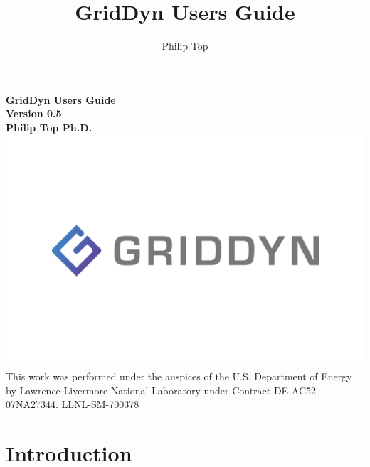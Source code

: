 \documentclass[12pt]{article} %
\title{GridDyn Users Guide}
\author{Philip Top}
\date{} %
\date{\displaydate{date}}
\begin{document}
\begin{titlepage}
	\centering
	\vfill
	{\bfseries\Large
		GridDyn Users Guide\\
		Version 0.5\\
		\vskip2cm
		Philip Top Ph.D.\\
	}    
	\vfill
		\includegraphics[width=\linewidth]{../images/GridDyn_FullColor.png}
	\vfill
	This work was performed under the auspices of the U.S. Department of Energy by
	Lawrence Livermore National Laboratory under Contract DE-AC52-07NA27344.
	LLNL-SM-700378
	\vfill
\end{titlepage}

\newpage
\tableofcontents
\section{Introduction}
\end{document}
